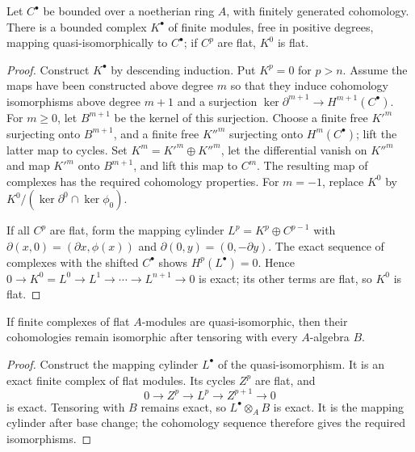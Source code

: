 \begin{lemma}
\label{mumford-source-complex-model}
Let $C^\bullet$ be bounded over a noetherian ring $A$, with finitely generated
cohomology. There is a bounded complex $K^\bullet$ of finite modules, free in
positive degrees, mapping quasi-isomorphically to $C^\bullet$; if $C^p$ are
flat, $K^0$ is flat.
\end{lemma}
\begin{proof}
Construct $K^\bullet$ by descending induction. Put $K^p=0$ for $p>n$.
Assume the maps have been constructed above degree $m$ so that they induce
cohomology isomorphisms above degree $m+1$ and a surjection
$\ker\partial^{m+1}\to H^{m+1}(C^\bullet)$. For $m\ge0$, let
$B^{m+1}$ be the kernel of this surjection. Choose a finite free ${K'}^m$
surjecting onto $B^{m+1}$, and a finite free ${K''}^m$ surjecting onto
$H^m(C^\bullet)$; lift the latter map to cycles. Set
$K^m={K'}^m\oplus{K''}^m$, let the differential vanish on ${K''}^m$ and
map ${K'}^m$ onto $B^{m+1}$, and lift this map to $C^m$. The resulting map
of complexes has the required cohomology properties. For $m=-1$, replace
$K^0$ by $K^0/(\ker\partial^0\cap\ker\phi_0)$.

If all $C^p$ are flat, form the mapping cylinder
$L^p=K^p\oplus C^{p-1}$ with
$\partial(x,0)=(\partial x,\phi(x))$ and
$\partial(0,y)=(0,-\partial y)$. The exact sequence of complexes with the
shifted $C^\bullet$ shows $H^p(L^\bullet)=0$. Hence
$0\to K^0=L^0\to L^1\to\cdots\to L^{n+1}\to0$ is exact; its other terms
are flat, so $K^0$ is flat.
\end{proof}

\begin{lemma}
\label{mumford-lem-flat-quasi-iso-base-change}
If finite complexes of flat $A$-modules are quasi-isomorphic, then their
cohomologies remain isomorphic after tensoring with every $A$-algebra $B$.
\end{lemma}
\begin{proof}
Construct the mapping cylinder $L^\bullet$ of the quasi-isomorphism. It is an
exact finite complex of flat modules. Its cycles $Z^p$ are flat, and
\[
0\to Z^p\to L^p\to Z^{p+1}\to0
\]
is exact. Tensoring with $B$ remains exact, so $L^\bullet\otimes_A B$ is
exact. It is the mapping cylinder after base change; the cohomology sequence
therefore gives the required isomorphisms.
\end{proof}

